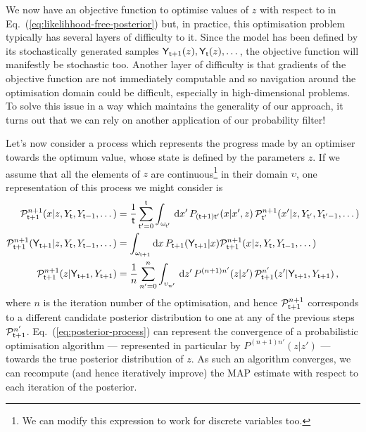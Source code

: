 We now have an objective function to optimise values of $z$ with respect to in Eq.~(\ref{eq:likelihhood-free-posterior}) but, in practice, this optimisation problem typically has several layers of difficulty to it. Since the model has been defined by its stochastically generated samples ${\sf Y}_{{\sf t}+1}(z), {\sf Y}_{{\sf t}}(z), \dots$, the objective function will manifestly be stochastic too. Another layer of difficulty is that gradients of the objective function are not immediately computable and so navigation around the optimisation domain could be difficult, especially in high-dimensional problems. To solve this issue in a way which maintains the generality of our approach, it turns out that we can rely on another application of our probability filter!

Let's now consider a process which represents the progress made by an optimiser towards the optimum value, whose state is defined by the parameters $z$. If we assume that all the elements of $z$ are continuous\footnote{We can modify this expression to work for discrete variables too.} in their domain $\upsilon$, one representation of this process we might consider is
\begin{align} 
{\cal P}^{n+1}_{{\sf t}+1}(x\vert z, Y_{{\sf t}}, Y_{{\sf t}-1}, \dots) &= \frac{1}{{\sf t}}\sum_{{\sf t}'=0}^{{\sf t}}\int_{\omega_{{\sf t}'}} \,{\rm d}x' \, P_{({\sf t}+1){\sf t}'}(x\vert x',z)\, {\cal P}^{n+1}_{{\sf t}'}(x'\vert z, Y_{{\sf t}'}, Y_{{\sf t}'-1}, \dots) \\
{\cal P}^{n+1}_{{\sf t}+1}({\sf Y}_{{\sf t}+1} \vert z, Y_{{\sf t}}, Y_{{\sf t}-1}, \dots) &= \int_{\omega_{{\sf t}+1}}{\rm d}x\, P_{{\sf t}+1}({\sf Y}_{{\sf t}+1} \vert x){\cal P}^{n+1}_{{\sf t}+1}(x\vert z, Y_{{\sf t}}, Y_{{\sf t}-1}, \dots) \\
{\cal P}^{n+1}_{{\sf t}+1}(z \vert {\sf Y}_{{\sf t}+1}, Y_{{\sf t}+1}) &= \frac{1}{n}\sum_{n'=0}^n\int_{\upsilon_{n'}} \,{\rm d}z' \, P^{(n+1)n'}(z\vert z')\, {\cal P}^{n'}_{{\sf t}+1}(z'\vert {\sf Y}_{{\sf t}+1}, Y_{{\sf t}+1}) \label{eq:posterior-process} \,,
\end{align}
where $n$ is the iteration number of the optimisation, and hence ${\cal P}^{n+1}_{{\sf t}+1}$ corresponds to a different candidate posterior distribution to one at any of the previous steps ${\cal P}^{n'}_{{\sf t}+1}$. Eq.~(\ref{eq:posterior-process}) can represent the convergence of a probabilistic optimisation algorithm --- represented in particular by $P^{(n+1)n'}(z\vert z')$ --- towards the true posterior distribution of $z$. As such an algorithm converges, we can recompute (and hence iteratively improve) the MAP estimate with respect to each iteration of the posterior.

